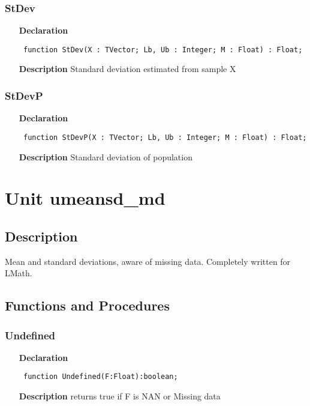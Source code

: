 \documentclass[12pt,a4paper,oneside]{report}
\newcommand{\lmath}[1]{   %
	\marginpar{\vspace{#1} 
		\begin{flushright}
			LMath
	\end{flushright} }
}
\newcommand{\declarationitem}[1]{\textbf{#1}}
\newcommand{\descriptiontitle}[1]{\textbf{#1}}
\newcommand{\code}[1]{\texttt{#1}}
\begin{document}
\subsubsection{StDev}
\label{umeansd-StDev}
\begin{itemize}\item[\declarationitem{Declaration}\hfill]
	\begin{flushleft}
		\code{
			function StDev(X : TVector; Lb, Ub : Integer; M : Float) : Float;}
	\end{flushleft}
	\item[\descriptiontitle{Description}]
	Standard deviation estimated from sample X
\end{itemize}
\subsubsection{StDevP}
\label{umeansd-StDevP}
\begin{itemize}\item[\declarationitem{Declaration}\hfill]
	\begin{flushleft}
		\code{
			function StDevP(X : TVector; Lb, Ub : Integer; M : Float) : Float;}
	\end{flushleft}
	\item[\descriptiontitle{Description}]
	Standard deviation of population
\end{itemize}
\section{Unit umeansd{\_}md}\lmath{-24pt}
\label{umeansd_md}
\subsection{Description}
Mean and standard deviations, aware of missing data. Completely written for LMath.
\subsection{Functions and Procedures}
\subsubsection{Undefined}
\label{umeansd_md-Undefined}
\begin{itemize}\item[\declarationitem{Declaration}\hfill]
	\begin{flushleft}
		\code{
			function Undefined(F:Float):boolean;}
	\end{flushleft}
	\item[\descriptiontitle{Description}]
	returns true if F is NAN or Missing data
\end{itemize}
\end{document}

